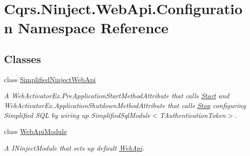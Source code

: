 \hypertarget{namespaceCqrs_1_1Ninject_1_1WebApi_1_1Configuration}{}\section{Cqrs.\+Ninject.\+Web\+Api.\+Configuration Namespace Reference}
\label{namespaceCqrs_1_1Ninject_1_1WebApi_1_1Configuration}
\subsection*{Classes}
\begin{DoxyCompactItemize}
\item 
class \hyperlink{classCqrs_1_1Ninject_1_1WebApi_1_1Configuration_1_1SimplifiedNinjectWebApi}{Simplified\+Ninject\+Web\+Api}
\begin{DoxyCompactList}\small\item\em A Web\+Activator\+Ex.\+Pre\+Application\+Start\+Method\+Attribute that calls \hyperlink{classCqrs_1_1Ninject_1_1WebApi_1_1Configuration_1_1SimplifiedNinjectWebApi_a7da23980ac13618949a389c0beac6e89_a7da23980ac13618949a389c0beac6e89}{Start} and Web\+Activator\+Ex.\+Application\+Shutdown\+Method\+Attribute that calls \hyperlink{classCqrs_1_1Ninject_1_1WebApi_1_1Configuration_1_1SimplifiedNinjectWebApi_a28327d1df27e02f828b52bb44319816d_a28327d1df27e02f828b52bb44319816d}{Stop} configuring Simplified S\+QL by wiring up Simplified\+Sql\+Module$<$\+T\+Authentication\+Token$>$. \end{DoxyCompactList}\item 
class \hyperlink{classCqrs_1_1Ninject_1_1WebApi_1_1Configuration_1_1WebApiModule}{Web\+Api\+Module}
\begin{DoxyCompactList}\small\item\em A I\+Ninject\+Module that sets up default \hyperlink{namespaceCqrs_1_1Ninject_1_1WebApi}{Web\+Api}. \end{DoxyCompactList}\end{DoxyCompactItemize}
